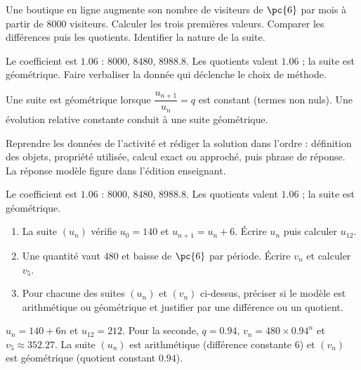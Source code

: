     \begin{activity}
    Une boutique en ligne augmente son nombre de visiteurs de $\pc{6}$ par mois à partir de $\num{8000}$ visiteurs. Calculer les trois premières valeurs. Comparer les différences puis les quotients. Identifier la nature de la suite.
    \begin{center}\end{center}
    \end{activity}
    \begin{solution}Le coefficient est $\num{1,06}$ : $\num{8000}$, $\num{8480}$, $\num{8988,8}$. Les quotients valent $\num{1,06}$ ; la suite est géométrique. Faire verbaliser la donnée qui déclenche le choix de méthode.\end{solution}

    \begin{summary}Une suite est géométrique lorsque $\dfrac{u_{n+1}}{u_n}=q$ est constant (termes non nuls). Une évolution relative constante conduit à une suite géométrique.\end{summary}

    \begin{example}
    Reprendre les données de l'activité et rédiger la solution dans l'ordre : définition des objets, propriété utilisée, calcul exact ou approché, puis phrase de réponse. La réponse modèle figure dans l'édition enseignant.
    \end{example}
    \begin{solution}Le coefficient est $\num{1,06}$ : $\num{8000}$, $\num{8480}$, $\num{8988,8}$. Les quotients valent $\num{1,06}$ ; la suite est géométrique.\end{solution}

    \begin{exercise}[essentiel]
    \begin{enumerate}\item La suite $(u_n)$ vérifie $u_0=140$ et $u_{n+1}=u_n+6$. Écrire $u_n$ puis calculer $u_{12}$.\item Une quantité vaut $480$ et baisse de $\pc{6}$ par période. Écrire $v_n$ et calculer $v_5$.\item Pour chacune des suites $(u_n)$ et $(v_n)$ ci-dessus, préciser si le modèle est arithmétique ou géométrique et justifier par une différence ou un quotient.\end{enumerate}
    \end{exercise}
    \begin{solution}$u_n=140+6n$ et $u_{12}=212$. Pour la seconde, $q=\num{0,94}$, $v_n=480\times\num{0,94}^n$ et $v_5\approx\num{352,27}$. La suite $(u_n)$ est arithmétique (différence constante $6$) et $(v_n)$ est géométrique (quotient constant $\num{0,94}$).\end{solution}

